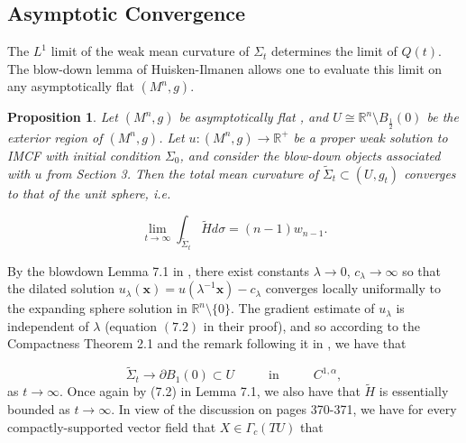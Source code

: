 \documentclass[12pt,twoside]{article}
\theoremstyle{plain}
\newtheorem{prop}[theorem]{Proposition}
\theoremstyle{definition}
\theoremstyle{remark}
\numberwithin{equation}{section}
\begin{document}
\subsection{Asymptotic Convergence}
The $L^{1}$ limit of the weak mean curvature of $\Sigma_{t}$ determines the limit of $Q(t)$. The blow-down lemma of Huisken-Ilmanen allows one to evaluate this limit on any asymptotically flat $(M^{n},g)$.
\begin{prop}
Let $(M^{n},g)$ be asymptotically flat , and $U \cong \mathbb{R}^{n} \setminus B_{\frac{1}{2}}(0)$ be the exterior region of $(M^{n},g)$. Let $u: (M^{n},g) \rightarrow \mathbb{R}^{+}$ be a proper weak solution to IMCF with initial condition $\Sigma_{0}$, and consider the blow-down objects associated with $u$ from Section 3. Then the total mean curvature of $\widetilde{\Sigma}_{t} \subset (U,g_{t})$ converges to that of the unit sphere, i.e.

\begin{equation*}
    \lim_{t \rightarrow \infty} \int_{\widetilde{\Sigma}_{t}} \widetilde{H} d\sigma = (n-1) w_{n-1}.
\end{equation*}
\end{prop}
By the blowdown Lemma 7.1 in \cite{HI}, there exist constants $\lambda \rightarrow 0$, $c_{\lambda} \rightarrow \infty$ so that the dilated solution $u_{\lambda}(\textbf{x}) = u(\lambda^{-1} \mathbf{x}) - c_{\lambda}$ converges locally uniformally to the expanding sphere solution in $\mathbb{R}^{n} \setminus \{ 0 \}$. The gradient estimate of $u_{\lambda}$ is independent of $\lambda$ (equation $(7.2)$ in their proof), and so according to the Compactness Theorem 2.1 and the remark following it in \cite{HI}, we have that

\begin{equation*}
    \widetilde{\Sigma}_{t} \rightarrow \partial B_{1} (0) \subset U \hspace{1cm} \text{ in } \hspace{1cm} C^{1,\alpha},
\end{equation*}
 as $t \rightarrow \infty$. Once again by (7.2) in Lemma 7.1, we also have that $\widetilde{H}$ is essentially bounded as $t \rightarrow \infty$. In view of the discussion on pages 370-371, we have for every compactly-supported vector field that $ X \in \Gamma_{c}(TU)$ that
\end{document}
